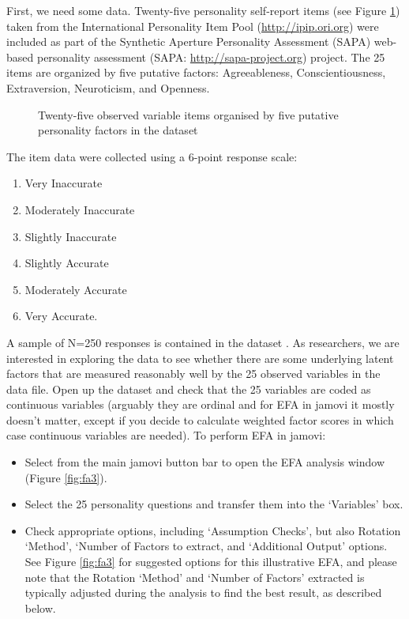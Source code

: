 
First, we need some data. Twenty-five personality self-report items (see Figure \ref{fig:fa2}) taken from the International Personality Item Pool (\url{http://ipip.ori.org}) were included as part of the Synthetic Aperture Personality Assessment (SAPA) web-based personality assessment (SAPA: \url{http://sapa-project.org}) project. The 25 items are organized by five putative factors: Agreeableness, Conscientiousness, Extraversion, Neuroticism, and Openness. 

\begin{figure}[!htb]
\begin{center}
\caption{Twenty-five observed variable items organised by five putative personality factors in the dataset }
\label{fig:fa2}
\HR
\end{center}
\end{figure}

The item data were collected using a 6-point response scale:

\begin{enumerate} \itemsep -2pt
\item Very Inaccurate
\item Moderately Inaccurate
\item Slightly Inaccurate
\item Slightly Accurate
\item Moderately Accurate
\item Very Accurate. 
\end{enumerate}


A sample of N=250 responses is contained in the dataset . As researchers, we are interested in exploring the data to see whether there are some underlying latent factors that are measured reasonably well by the 25 observed variables in the  data file. Open up the dataset and check that the 25 variables are coded as continuous variables (arguably they are ordinal and for EFA in jamovi it mostly doesn't matter, except if you decide to calculate weighted factor scores in which case continuous variables are needed). To perform EFA in jamovi:

\begin{itemize} \itemsep -2pt
\item Select  from the main jamovi button bar to open the EFA analysis window (Figure \ref{fig:fa3}).
\item Select the 25 personality questions and transfer them into the ‘Variables’ box.
\item Check appropriate options, including ‘Assumption Checks’, but also Rotation ‘Method’, ‘Number of Factors to extract, and ‘Additional Output’ options. See Figure \ref{fig:fa3} for suggested options for this illustrative EFA, and please note that the Rotation ‘Method’ and ‘Number of Factors’ extracted is typically adjusted during the analysis to find the best result, as described below.
\end{itemize}

